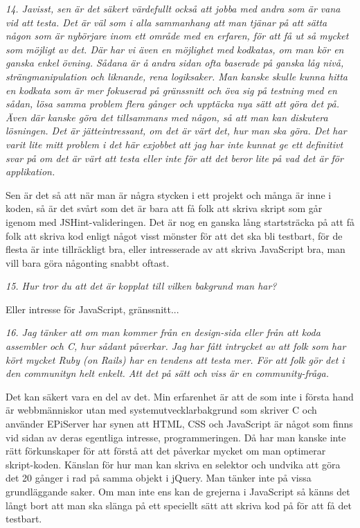 \documentclass[11pt]{article}
\begin{document}
\emph{14. Javisst, sen är det säkert värdefullt också att jobba med andra som är vana vid att testa. Det är väl som i alla sammanhang att man tjänar på att sätta någon som är nybörjare inom ett område med en erfaren, för att få ut så mycket som möjligt av det. Där har vi även en möjlighet med kodkatas, om man kör en ganska enkel övning. Sådana är å andra sidan ofta baserade på ganska låg nivå, strängmanipulation och liknande, rena logiksaker. Man kanske skulle kunna hitta en kodkata som är mer fokuserad på gränssnitt och öva sig på testning med en sådan, lösa samma problem flera gånger och upptäcka nya sätt att göra det på. Även där kanske göra det tillsammans med någon, så att man kan diskutera lösningen. Det är jätteintressant, om det är värt det, hur man ska göra. Det har varit lite mitt problem i det här exjobbet att jag har inte kunnat ge ett definitivt svar på om det är värt att testa eller inte för att det beror lite på vad det är för applikation.}

Sen är det så att när man är några stycken i ett projekt och många är inne i koden, så är det svårt som det är bara att få folk att skriva skript som går igenom med JSHint-valideringen. Det är nog en ganska lång startsträcka på att få folk att skriva kod enligt något visst mönster för att det ska bli testbart, för de flesta är inte tillräckligt bra, eller intresserade av att skriva JavaScript bra, man vill bara göra någonting snabbt oftast.

\emph{15. Hur tror du att det är kopplat till vilken bakgrund man har?}

Eller intresse för JavaScript, gränssnitt...

\emph{16. Jag tänker att om man kommer från en design-sida eller från att koda assembler och C, hur sådant påverkar. Jag har fått intrycket av att folk som har kört mycket Ruby (on Rails) har en tendens att testa mer. För att folk gör det i den communityn helt enkelt. Att det på sätt och viss är en community-fråga.}

Det kan säkert vara en del av det. Min erfarenhet är att de som inte i första hand är webbmänniskor utan med systemutvecklarbakgrund som skriver C\nolinebreak\hspace{-.05em}\raisebox{.3ex}{\scriptsize\bf \#} och använder EPiServer har synen att HTML, CSS och JavaScript är något som finns vid sidan av deras egentliga intresse, programmeringen. Då har man kanske inte rätt förkunskaper för att förstå att det påverkar mycket om man optimerar skript-koden. Känslan för hur man kan skriva en selektor och undvika att göra det 20 gånger i rad på samma objekt i jQuery. Man tänker inte på vissa grundläggande saker. Om man inte ens kan de grejerna i JavaScript så känns det långt bort att man ska slänga på ett speciellt sätt att skriva kod på för att få det testbart.
\end{document}
